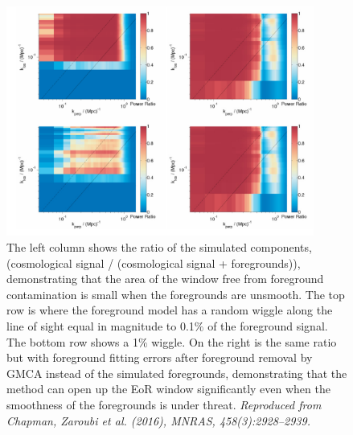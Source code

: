 \begin{figure}
\begin{center}
    \includegraphics[width=0.9\textwidth]{Chapman_Jelic/Images/Em_window.png}
\end{center}
    \caption{The left column shows the ratio of the simulated components, (cosmological signal / (cosmological signal + foregrounds)), demonstrating that the area of the window free from foreground contamination is small when the foregrounds are unsmooth. The top row is where the foreground model has a random wiggle along the line of sight equal in magnitude to 0.1$\%$ of the foreground signal. The bottom row shows a 1$\%$ wiggle. On the right is the same ratio but with foreground fitting errors after foreground removal by GMCA instead of the simulated foregrounds, demonstrating that the method can open up the EoR window significantly even when the smoothness of the foregrounds is under threat. \textit{Reproduced from Chapman, Zaroubi et al. (2016), MNRAS, 458(3):2928–2939.}}
    \label{fig:Chap_window}
\end{figure}

